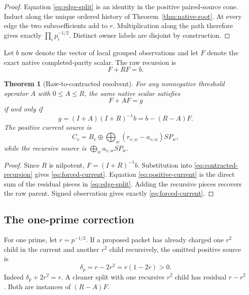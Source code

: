 \documentclass[11pt]{article}
\newtheorem{theorem}{Theorem}[section]
\begin{document}
\begin{proof}
Equation \eqref{eq:edge-split} is an identity in the positive paired-source
cone.  Induct along the unique ordered history of
Theorem~\ref{thm:native-root}.  At every edge the two subcoefficients add to
$r$.  Multiplication along the path therefore gives exactly
$\prod_i p_i^{-1/2}$.  Distinct owner labels are disjoint by construction.
\end{proof}

Let $b$ now denote the vector of local grouped observations and let $F$ denote
the exact native completed-parity scalar.  The raw recursion is
\begin{equation}\label{eq:raw-recursion}
 F+RF=b.
\end{equation}

\begin{theorem}[Raw-to-contracted resolvent]\label{thm:resolvent}
For any nonnegative threshold operator $A$ with $0\le A\le R$, the same native
scalar satisfies
\begin{equation}\label{eq:contracted-recursion}
 F+AF=g
\end{equation}
if and only if
\begin{equation}\label{eq:forced-current}
 \boxed{g=(I+A)(I+R)^{-1}b=b-(R-A)F.}
\end{equation}
The positive current source is
\begin{equation}\label{eq:positive-current}
 C_v=B_v\oplus\bigoplus_w(r_{v,w}-a_{v,w})SP_w,
\end{equation}
while the recursive source is
$\bigoplus_w a_{v,w}SP_w$.
\end{theorem}

\begin{proof}
Since $R$ is nilpotent, $F=(I+R)^{-1}b$.  Substitution into
\eqref{eq:contracted-recursion} gives \eqref{eq:forced-current}.  Equation
\eqref{eq:positive-current} is the direct sum of the residual pieces in
\eqref{eq:edge-split}.  Adding the recursive pieces recovers the raw parent.
Signed observation gives exactly \eqref{eq:forced-current}.
\end{proof}

\subsection{The one-prime correction}

For one prime, let $r=p^{-1/2}$.  If a proposed packet has already charged one
$r^2$ child in the current and another $r^2$ child recursively, the omitted
positive source is
\begin{equation}\label{eq:delta}
 \boxed{\delta_p=r-2r^2=r(1-2r)>0.}
\end{equation}
Indeed $\delta_p+2r^2=r$.  A cleaner split with one recursive $r^2$ child has
residual $r-r^2$.  Both are instances of $(R-A)F$.
\end{document}
